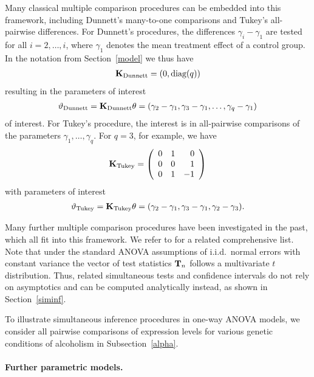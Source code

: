\documentclass[12pt,a4paper]{article}
\begin{document}
Many classical multiple comparison procedures can be embedded into this
framework, including Dunnett's many-to-one comparisons and Tukey's
all-pairwise differences. For Dunnett's procedures, the differences $%
\gamma_i - \gamma_1$ are tested for all $i=2, \ldots, i$, where $\gamma_1$
denotes the mean treatment effect of a control group. In the notation from
Section~\ref{model} we thus have 
\begin{eqnarray*}
\mathbf{K}_\text{Dunnett} = (0, \text{diag}(q))
\end{eqnarray*}
resulting in the parameters of interest
\begin{eqnarray*}
\vartheta_\text{Dunnett} = \mathbf{K}_\text{Dunnett} \theta = (\gamma_2 - \gamma_1, \gamma_3 - \gamma_1,
\dots, \gamma_q - \gamma_1)
\end{eqnarray*}
of interest. For Tukey's procedure, the interest is in all-pairwise
comparisons of the parameters $\gamma_1, \dots, \gamma_q$. For $q = 3$, for
example, we have 
\begin{eqnarray*}
\K_\text{Tukey} = \left( 
\begin{array}{rrr}
0 & 1 & 0 \\ 
0 & 0 & 1 \\ 
0 & 1 & -1%
\end{array}
\right)
\end{eqnarray*}
with parameters of interest
\begin{eqnarray*}
\vartheta_\text{Tukey} = \mathbf{K}_\text{Tukey} \theta = (\gamma_2 - \gamma_1, \gamma_3 - \gamma_1,
\gamma_2 - \gamma_3).
\end{eqnarray*}

Many further multiple comparison procedures have been investigated in the
past, which all fit into this framework. We refer to
\cite{BretzGenzHothorn2001} for
a related comprehensive list. Note that under the standard ANOVA assumptions
of i.i.d.~normal errors with constant variance the vector of test statistics 
$\mathbf{T}_n$ follows a multivariate $t$ distribution. Thus, related simultaneous
tests and confidence intervals do not rely on asymptotics and can be
computed analytically instead, as shown in Section~\ref{siminf}.

To illustrate simultaneous inference procedures in one-way ANOVA models, we
consider all pairwise comparisons of expression levels for various genetic
conditions of alcoholism in Subsection~\ref{alpha}.

\paragraph{Further parametric models.}
\end{document}

